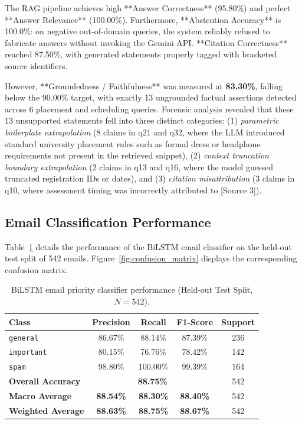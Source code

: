 \documentclass[11pt,a4paper]{article}
\begin{document}
The RAG pipeline achieves high **Answer Correctness** (95.80\%) and perfect **Answer Relevance** (100.00\%). Furthermore, **Abstention Accuracy** is 100.0\%: on negative out-of-domain queries, the system reliably refused to fabricate answers without invoking the Gemini API. **Citation Correctness** reached 87.50\%, with generated statements properly tagged with bracketed source identifiers.

However, **Groundedness / Faithfulness** was measured at \textbf{83.30\%}, falling below the 90.00\% target, with exactly 13 ungrounded factual assertions detected across 6 placement and scheduling queries. Forensic analysis revealed that these 13 unsupported statements fell into three distinct categories: (1) \textit{parametric boilerplate extrapolation} (8 claims in q21 and q32, where the LLM introduced standard university placement rules such as formal dress or headphone requirements not present in the retrieved snippet), (2) \textit{context truncation boundary extrapolation} (2 claims in q13 and q16, where the model guessed truncated registration IDs or dates), and (3) \textit{citation misattribution} (3 claims in q10, where assessment timing was incorrectly attributed to [Source 3]).

\subsection{Email Classification Performance}
Table~\ref{tab:classifier_results} details the performance of the BiLSTM email classifier on the held-out test split of 542 emails. Figure~\ref{fig:confusion_matrix} displays the corresponding confusion matrix.

\begin{table}[t]
\centering
\small
\caption{BiLSTM email priority classifier performance (Held-out Test Split, $N=542$).}
\label{tab:classifier_results}
\begin{tabular}{l c c c c}
\toprule
\textbf{Class} & \textbf{Precision} & \textbf{Recall} & \textbf{F1-Score} & \textbf{Support} \\
\midrule
\texttt{general} & 86.67\% & 88.14\% & 87.39\% & 236 \\
\texttt{important} & 80.15\% & 76.76\% & 78.42\% & 142 \\
\texttt{spam} & 98.80\% & 100.00\% & 99.39\% & 164 \\
\midrule
\textbf{Overall Accuracy} & \multicolumn{3}{c}{\textbf{88.75\%}} & 542 \\
\textbf{Macro Average} & \textbf{88.54\%} & \textbf{88.30\%} & \textbf{88.40\%} & 542 \\
\textbf{Weighted Average} & \textbf{88.63\%} & \textbf{88.75\%} & \textbf{88.67\%} & 542 \\
\bottomrule
\end{tabular}
\end{table}
\end{document}
